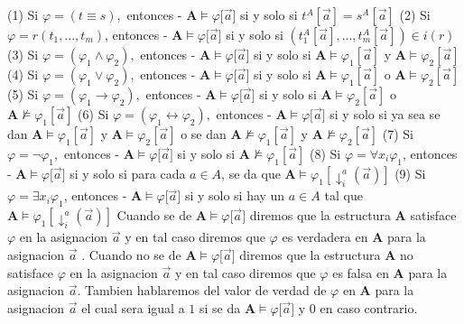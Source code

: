 (1) Si \(\varphi =(t\equiv s),\) entonces
- \(\mathbf{A}\models \varphi \lbrack \vec{a}]\) si y solo si \(t^{A}[ \vec{a}]=s^{A}[\vec{a}]\)
(2) Si \(\varphi =r(t_{1},...,t_{m})\), entonces
- \(\mathbf{A}\models \varphi \lbrack \vec{a}]\) si y solo si \( (t_{1}^{A}[\vec{a}],...,t_{m}^{A}[\vec{a}])\in i(r)\)
(3) Si \(\varphi =(\varphi _{1}\wedge \varphi _{2}),\) entonces
- \(\mathbf{A}\models \varphi \lbrack \vec{a}]\) si y solo si \(\mathbf{A }\models \varphi _{1}[\vec{a}]\) y \(\mathbf{A}\models \varphi _{2}[\vec{a}]\)
(4) Si \(\varphi =(\varphi _{1}\vee \varphi _{2}),\) entonces
- \(\mathbf{A}\models \varphi \lbrack \vec{a}]\) si y solo si \(\mathbf{A }\models \varphi _{1}[\vec{a}]\) o \(\mathbf{A}\models \varphi _{2}[\vec{a}]\)
(5) Si \(\varphi =(\varphi _{1}\rightarrow \varphi _{2}),\) entonces
- \(\mathbf{A}\models \varphi \lbrack \vec{a}]\) si y solo si \(\mathbf{A }\models \varphi _{2}[\vec{a}]\) o \(\mathbf{A}\not\models \varphi _{1}[\vec{a} ]\)
(6) Si \(\varphi =(\varphi _{1}\leftrightarrow \varphi _{2}),\) entonces
- \(\mathbf{A}\models \varphi \lbrack \vec{a}]\) si y solo si ya sea se dan \(\mathbf{A}\models \varphi _{1}[\vec{a}]\) y \(\mathbf{A}\models \varphi _{2}[\vec{a}]\) o se dan \(\mathbf{A}\not\models \varphi _{1}[\vec{a}]\) y \( \mathbf{A}\not\models \varphi _{2}[\vec{a}]\)
(7) Si \(\varphi =\lnot \varphi _{1},\) entonces
- \(\mathbf{A}\models \varphi \lbrack \vec{a}]\) si y solo si \(\mathbf{A }\not\models \varphi _{1}[\vec{a}]\)
(8) Si \(\varphi =\forall x_{i}\varphi _{1}\), entonces
- \(\mathbf{A}\models \varphi \lbrack \vec{a}]\) si y solo si para cada \(a\in A\), se da que \(\mathbf{A}\models \varphi _{1}[\downarrow _{i}^{a}(\vec{ a})]\)
(9) Si \(\varphi =\exists x_{i}\varphi _{1}\), entonces
- \(\mathbf{A}\models \varphi \lbrack \vec{a}]\) si y solo si hay un \( a\in A\) tal que \(\mathbf{A}\models \varphi _{1}[\downarrow _{i}^{a}(\vec{a} )] \)
Cuando se de \(\mathbf{A}\models \varphi \lbrack \vec{a}]\) diremos que la estructura \(\mathbf{A}\) satisface \(\varphi \) en la asignacion \(\vec{a}\) y en tal caso diremos que \(\varphi \) es verdadera en \(\mathbf{A}\) para la asignacion \(\vec{a}\) . Cuando no se de \(\mathbf{A}\models \varphi \lbrack \vec{a}]\) diremos que la estructura \(\mathbf{A}\) no satisface \(\varphi \) en la asignacion \(\vec{a}\) y en tal caso diremos que \(\varphi \) es falsa en \(\mathbf{A}\) para la asignacion \(\vec{a}\). Tambien hablaremos del valor de verdad de \(\varphi \) en \( \mathbf{A}\) para la asignacion \(\vec{a}\) el cual sera igual a \(1\) si se da \(\mathbf{A}\models \varphi \lbrack \vec{a}]\) y \(0\) en caso contrario.

